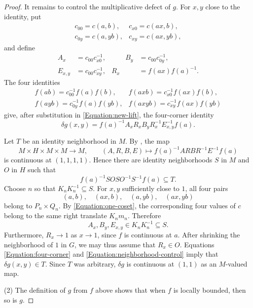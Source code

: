 \documentclass[12pt]{amsart}
\theoremstyle{definition}
\begin{document}
\begin{proof}
It remains to control the multiplicative defect of $g$. For $x,y$ close to
the identity, put 
\begin{equation*}
\begin{array}{ll}
c_{00}=c(a,b), & c_{x0}=c(ax,b), \\ 
c_{0y}=c(a,yb), & c_{xy}=c(ax,yb),%
\end{array}%
\end{equation*}%
and define 
\begin{equation*}
\begin{aligned} A_x&=c_{00}c_{x0}^{-1},&\qquad B_y&=c_{00}c_{0y}^{-1},\\
E_{x,y}&=c_{00}c_{xy}^{-1},& R_x&=f(ax)f(a)^{-1}. \end{aligned}
\end{equation*}%
The four identities 
\begin{equation*}
\begin{array}{ll}
f(ab)=c_{00}^{-1}f(a)f(b), & f(axb)=c_{x0}^{-1}f(ax)f(b), \\ 
f(ayb)=c_{0y}^{-1}f(a)f(yb), & f(axyb)=c_{xy}^{-1}f(ax)f(yb)%
\end{array}%
\end{equation*}%
give, after substitution in \eqref{Equation:new-lift}, the four-corner
identity 
\begin{equation}
\delta g(x,y)=f(a)^{-1}A_{x}R_{x}B_{y}R_{x}^{-1}E_{x,y}^{-1}f(a).
\label{Equation:four-corner}
\end{equation}

Let $T$ be an identity neighborhood in $M$. By %
, the map 
\begin{equation*}
M\times H\times M\times M\longrightarrow M,\qquad (A,R,B,E)\longmapsto
f(a)^{-1}ARBR^{-1}E^{-1}f(a)
\end{equation*}%
is continuous at $(1,1,1,1)$. Hence there are identity neighborhoods $S$ in $%
M$ and $O$ in $H$ such that 
\begin{equation}
f(a)^{-1}SOSO^{-1}S^{-1}f(a)\subseteq T.
\label{Equation:neighborhood-control}
\end{equation}%
Choose $n$ so that $K_{n}K_{n}^{-1}\subseteq S$. For $x,y$ sufficiently
close to $1$, all four pairs 
\begin{equation*}
(a,b),\quad (ax,b),\quad (a,yb),\quad (ax,yb)
\end{equation*}%
belong to $P_{n}\times Q_{n}$. By \eqref{Equation:one-coset}, the
corresponding four values of $c$ belong to the same right translate $%
K_{n}m_{n}$. Therefore 
\begin{equation*}
A_{x},B_{y},E_{x,y}\in K_{n}K_{n}^{-1}\subseteq S.
\end{equation*}%
Furthermore, $R_{x}\rightarrow 1$ as $x\rightarrow 1$, since $f$ is
continuous at $a$. After shrinking the neighborhood of $1$ in $G$, we may
thus assume that $R_{x}\in O$. Equations \eqref{Equation:four-corner} and %
\eqref{Equation:neighborhood-control} imply that $\delta g(x,y)\in T$. Since 
$T$ was arbitrary, $\delta g$ is continuous at $(1,1)$ as an $M$-valued map.

(2) The definition of $g$ from $f$ above shows that when $f$ is locally
bounded, then so is $g$.
\end{proof}
\end{document}
